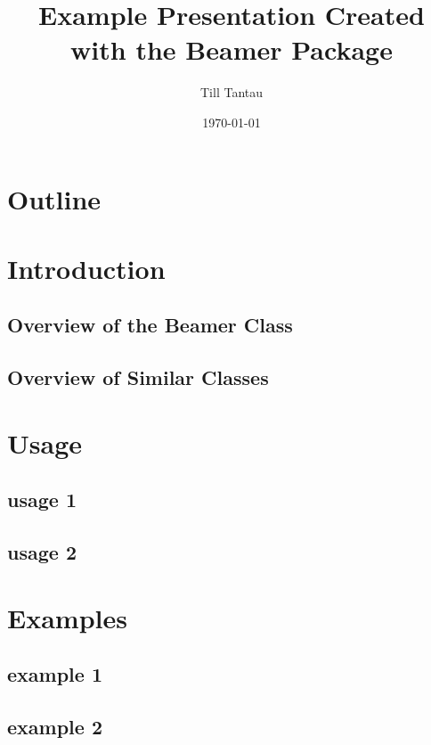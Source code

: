 \documentclass{beamer}
\title{Example Presentation Created with the Beamer Package}
\author{Till Tantau}
\date{\today}
\begin{document}
\begin{frame}
\titlepage
\end{frame}
\section*{Outline}
\begin{frame}
\tableofcontents
\end{frame}
\section{Introduction}
\subsection{Overview of the Beamer Class}
\subsection{Overview of Similar Classes}
\section{Usage}
\subsection{usage 1}
\subsection{usage 2}
\section{Examples}
\subsection{example 1}
\subsection{example 2}
\begin{frame}
\end{frame} %
\end{document}

